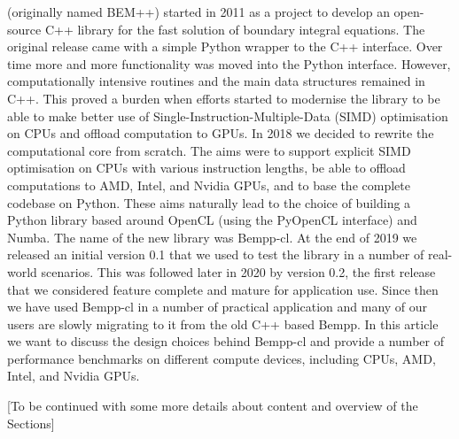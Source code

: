  (originally named BEM++) started in 2011 as a project to develop an open-source C++ library for the fast solution of boundary integral equations. The original release came with a simple Python wrapper to the C++ interface. Over time more and more functionality was moved into the Python interface. However, computationally intensive routines and the main data structures remained in C++. This proved a burden when efforts started to modernise the library to be able to make better use of Single-Instruction-Multiple-Data (SIMD) optimisation on CPUs and offload computation to GPUs. In 2018 we decided to rewrite the computational core from scratch. The aims were to support explicit SIMD optimisation on CPUs with various instruction lengths, be able to offload computations to AMD, Intel, and Nvidia GPUs, and to base the complete codebase on Python. These aims naturally lead to the choice of building a Python library based around OpenCL (using the PyOpenCL interface) and Numba. The name of the new library was Bempp-cl. At the end of 2019 we released an initial version 0.1 that we used to test the library in a number of real-world scenarios. This was followed later in 2020 by version 0.2, the first release that we considered feature complete and mature for application use. Since then we have used Bempp-cl in a number of practical application and many of our users are slowly migrating to it from the old C++ based Bempp. In this article we want to discuss the design choices behind Bempp-cl and provide a number of performance benchmarks on different compute devices, including CPUs, AMD, Intel, and Nvidia GPUs.

[To be continued with some more details about content and overview of the Sections]
